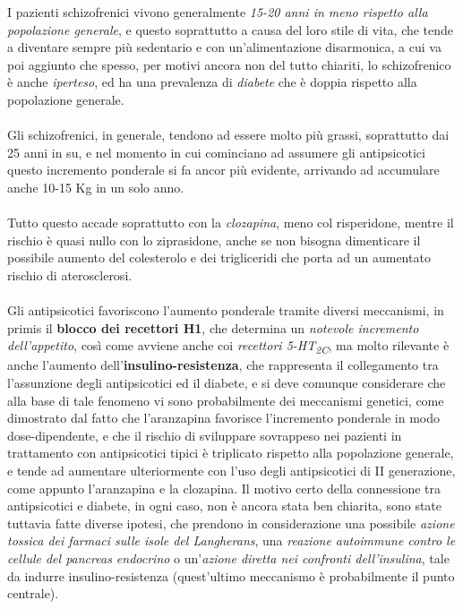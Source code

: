 I pazienti schizofrenici vivono generalmente \emph{15-20 anni in meno
rispetto alla popolazione generale}, e questo soprattutto a causa del
loro stile di vita, che tende a diventare sempre più sedentario e con
un'alimentazione disarmonica, a cui va poi aggiunto che spesso, per
motivi ancora non del tutto chiariti, lo schizofrenico è anche
\emph{iperteso}, ed ha una prevalenza di \emph{diabete} che è doppia
rispetto alla popolazione generale.
\\\\
Gli schizofrenici, in generale, tendono ad essere molto più grassi,
soprattutto dai 25 anni in su, e nel momento in cui cominciano ad
assumere gli antipsicotici questo incremento ponderale si fa ancor più
evidente, arrivando ad accumulare anche 10-15 Kg in un solo anno.
\\\\
Tutto questo accade soprattutto con la \emph{clozapina}, meno col
risperidone, mentre il rischio è quasi nullo con lo ziprasidone, anche
se non bisogna dimenticare il possibile aumento del colesterolo e dei
trigliceridi che porta ad un aumentato rischio di aterosclerosi.
\\\\
Gli antipsicotici favoriscono l'aumento ponderale tramite diversi
meccanismi, in primis il \textbf{blocco dei recettori H1}, che determina
un \emph{notevole incremento dell'appetito}, così come avviene anche coi
\emph{recettori 5-HT\textsubscript{2C}}, ma molto rilevante è anche
l'aumento dell'\textbf{insulino-resistenza}, che rappresenta il
collegamento tra l'assunzione degli antipsicotici ed il diabete, e si
deve comunque considerare che alla base di tale fenomeno vi sono
probabilmente dei meccanismi genetici, come dimostrato dal fatto che
l'aranzapina favorisce l'incremento ponderale in modo dose-dipendente, e
che il rischio di sviluppare sovrappeso nei pazienti in trattamento con
antipsicotici tipici è triplicato rispetto alla popolazione generale, e
tende ad aumentare ulteriormente con l'uso degli antipsicotici di II
generazione, come appunto l'aranzapina e la clozapina. Il motivo certo
della connessione tra antipsicotici e diabete, in ogni caso, non è
ancora stata ben chiarita, sono state tuttavia fatte diverse ipotesi,
che prendono in considerazione una possibile \emph{azione tossica dei
farmaci sulle isole del Langherans}, una \emph{reazione autoimmune
contro le cellule del pancreas endocrino} o un'\emph{azione diretta nei
confronti dell'insulina}, tale da indurre insulino-resistenza
(quest'ultimo meccanismo è probabilmente il punto centrale).


